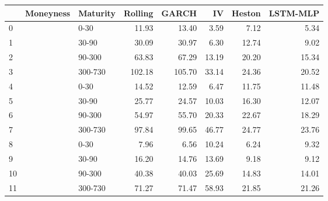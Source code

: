 \begin{tabular}{lllrrrrr}
\toprule
{} & Moneyness & Maturity &  Rolling &   GARCH &     IV &  Heston &  LSTM-MLP \\
\midrule
0  &           &     0-30 &    11.93 &   13.40 &   3.59 &    7.12 &      5.34 \\
1  &           &    30-90 &    30.09 &   30.97 &   6.30 &   12.74 &      9.02 \\
2  &           &   90-300 &    63.83 &   67.29 &  13.19 &   20.20 &     15.34 \\
3  &           &  300-730 &   102.18 &  105.70 &  33.14 &   24.36 &     20.52 \\
4  &           &     0-30 &    14.52 &   12.59 &   6.47 &   11.75 &     11.48 \\
5  &           &    30-90 &    25.77 &   24.57 &  10.03 &   16.30 &     12.07 \\
6  &           &   90-300 &    54.97 &   55.70 &  20.33 &   22.67 &     18.29 \\
7  &           &  300-730 &    97.84 &   99.65 &  46.77 &   24.77 &     23.76 \\
8  &           &     0-30 &     7.96 &    6.56 &  10.24 &    6.24 &      9.32 \\
9  &           &    30-90 &    16.20 &   14.76 &  13.69 &    9.18 &      9.12 \\
10 &           &   90-300 &    40.38 &   40.03 &  25.69 &   14.83 &     14.01 \\
11 &           &  300-730 &    71.27 &   71.47 &  58.93 &   21.85 &     21.26 \\
\bottomrule
\end{tabular}
